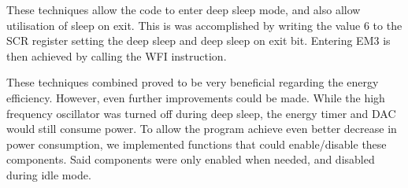 These techniques allow the code to enter deep sleep mode, and also allow utilisation of sleep on exit. This is was accomplished by writing the value 6 to the SCR register setting the deep sleep and deep sleep on exit bit. Entering EM3 is then achieved by calling the WFI instruction.

These techniques combined proved to be very beneficial regarding the energy efficiency. However, even further improvements could be made. While the high frequency oscillator was turned off during deep sleep, the energy timer and DAC would still consume power. To allow the program achieve even better decrease in power consumption, we implemented functions that could enable/disable these components. Said components were only enabled when needed, and disabled during idle mode.